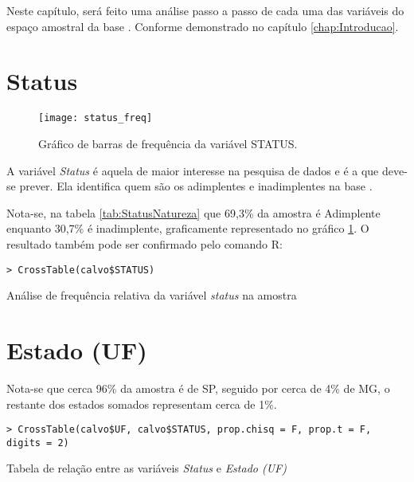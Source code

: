 Neste capítulo, será feito uma análise passo a passo de cada uma das
variáveis do espaço amostral da base \nomeDaBase{}. Conforme demonstrado
no capítulo \ref{chap:Introducao}.


\section{Status}

\begin{figure}
\begin{centering}
\texttt{[image: status\_freq]}
\par\end{centering}

\caption{\label{fig:FreqStatus}Gráfico de barras de frequência da variável
STATUS.}
\end{figure}
A variável \emph{Status }é aquela de maior interesse na pesquisa de
dados e é a que deve-se prever. Ela identifica quem são os adimplentes
e inadimplentes na base \nomeDaBase{}.

Nota-se, na tabela \ref{tab:StatusNatureza} que 69,3\% da amostra
é Adimplente enquanto 30,7\% é inadimplente, graficamente representado
no gráfico \ref{fig:FreqStatus}. O resultado também pode ser confirmado
pelo comando R:

\begin{verbatim}
> CrossTable(calvo$STATUS)
\end{verbatim}

\begin{table}[h]
\centering

\caption{\label{tab:StatusEstado}Análise de frequência relativa da variável \emph{status} na amostra}
\end{table}

\section{Estado (UF)}

Nota-se que cerca 96\% da amostra é de SP, seguido por cerca de 4\%
de MG, o restante dos estados somados representam cerca de 1\%.

\begin{verbatim}
> CrossTable(calvo$UF, calvo$STATUS, prop.chisq = F, prop.t = F, digits = 2)
\end{verbatim}

\begin{table}[h]
\centering

\caption{\label{tab:StatusEstado}Tabela de relação entre as variáveis \emph{Status} e \emph{Estado (UF)}}
\end{table}

